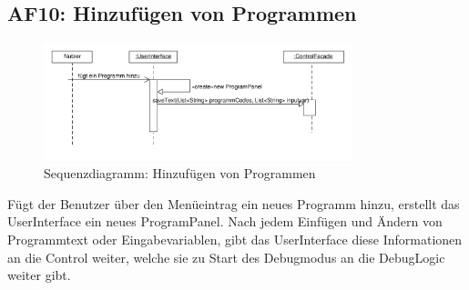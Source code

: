 \documentclass[parskip=full]{scrartcl}
\begin{document}
\newpage
\subsection{AF10: Hinzufügen von Programmen}
\begin{figure}[!h]
\centering
\includegraphics[width=0.8\textwidth]{diagrammIdeenUmlet/SequenceDiagrams/seq_AF10PDF.pdf}
\caption{Sequenzdiagramm: Hinzufügen von Programmen}
\end{figure}
Fügt der Benutzer über den Menüeintrag ein neues Programm hinzu, erstellt das UserInterface ein
neues ProgramPanel. Nach jedem Einfügen und Ändern von Programmtext oder Eingabevariablen, gibt
das UserInterface diese Informationen an die Control weiter, welche sie zu Start des Debugmodus
an die DebugLogic weiter gibt.

\newpage
\end{document}
